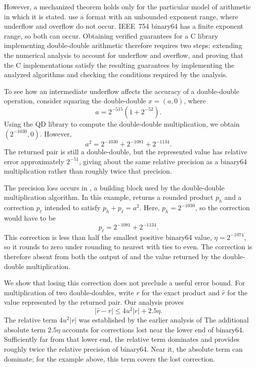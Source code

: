 However, a mechanized theorem holds only for the particular model of
arithmetic in which it is stated. \citeauthor{Rideau2022} use a format with
an unbounded exponent range, where underflow and overflow do not occur.
IEEE~754 binary64 has a finite exponent range, so both can occur. Obtaining
verified guarantees for a C library implementing double-double arithmetic
therefore requires two steps: extending the numerical analysis to account
for underflow and overflow, and proving that the C implementations satisfy
the resulting guarantees by implementing the analyzed algorithms and checking
the conditions required by the analysis.

To see how an intermediate underflow affects the accuracy of a double-double 
operation, consider squaring the double-double $x=(a,0)$, where
\[
 a=2^{-515}(1+2^{-52}).
\]
Using the QD library to compute the double-double multiplication,
we obtain $(2^{-1030},0)$. However,
\[
 a^2=2^{-1030}+2^{-1081}+2^{-1134}.
\]
The returned pair is still a double-double, but the represented value has
relative error approximately $2^{-51}$, giving about the same relative
precision as a binary64 multiplication rather than roughly twice that
precision.

The precision loss occurs in \FastTwoMult{}, a building block used by the
double-double multiplication algorithm. In this example, \FastTwoMult{} returns
a rounded product $p_h$ and a correction $p_\ell$ intended to satisfy
$p_h+p_\ell=a^2$.
Here, $p_h=2^{-1030}$, so the correction would have to be
\[
 p_\ell=2^{-1081}+2^{-1134}.
\]
This correction is less than half the smallest positive binary64 value,
$\eta=2^{-1074}$, so it rounds to zero under rounding to nearest with ties
to even. The correction is therefore absent from both the output of 
\FastTwoMult{} and the value returned by the double-double multiplication.

We show that losing this correction does not preclude a useful
error bound. For multiplication of two double-doubles, write $r$
for the exact product and $\widehat r$ for the value represented by the
returned pair. Our analysis proves
\[
 |\widehat r-r|\leq 4u^2|r|+2.5\eta.
\]
The relative term $4u^2|r|$ was established by the earlier analysis of
\citeauthor{Joldes2017} The additional absolute term $2.5\eta$ accounts for
corrections lost near the lower end of binary64. Sufficiently far from that
lower end, the relative term dominates and provides roughly twice the
relative precision of binary64. Near it, the absolute term can dominate; for
the example above, this term covers the lost correction.

